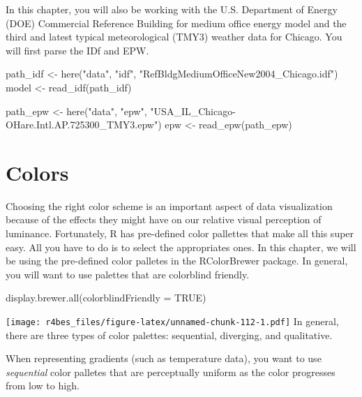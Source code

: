 \documentclass[
]{book}
\newenvironment{Shaded}{\begin{snugshade}}{\end{snugshade}}
\newcommand{\AttributeTok}[1]{\textcolor[rgb]{0.77,0.63,0.00}{#1}}
\newcommand{\ConstantTok}[1]{\textcolor[rgb]{0.00,0.00,0.00}{#1}}
\newcommand{\FunctionTok}[1]{\textcolor[rgb]{0.00,0.00,0.00}{#1}}
\newcommand{\NormalTok}[1]{#1}
\newcommand{\OtherTok}[1]{\textcolor[rgb]{0.56,0.35,0.01}{#1}}
\newcommand{\StringTok}[1]{\textcolor[rgb]{0.31,0.60,0.02}{#1}}
\begin{document}
In this chapter, you will also be working with the U.S. Department of Energy (DOE) Commercial Reference Building for medium office energy model \citep{deru_us_2011} and the third and latest typical meteorological (TMY3) weather data for Chicago. You will first parse the IDf and EPW.

\begin{Shaded}
\begin{Highlighting}[]
\NormalTok{path\_idf }\OtherTok{\textless{}{-}} \FunctionTok{here}\NormalTok{(}\StringTok{"data"}\NormalTok{, }\StringTok{"idf"}\NormalTok{, }\StringTok{"RefBldgMediumOfficeNew2004\_Chicago.idf"}\NormalTok{)}
\NormalTok{model }\OtherTok{\textless{}{-}} \FunctionTok{read\_idf}\NormalTok{(path\_idf)}

\NormalTok{path\_epw }\OtherTok{\textless{}{-}} \FunctionTok{here}\NormalTok{(}\StringTok{"data"}\NormalTok{, }\StringTok{"epw"}\NormalTok{, }\StringTok{"USA\_IL\_Chicago{-}OHare.Intl.AP.725300\_TMY3.epw"}\NormalTok{)}
\NormalTok{epw }\OtherTok{\textless{}{-}} \FunctionTok{read\_epw}\NormalTok{(path\_epw)}
\end{Highlighting}
\end{Shaded}

\hypertarget{colors}{%
\section{Colors}\label{colors}}

Choosing the right color scheme is an important aspect of data visualization because of the effects they might have on our relative visual perception of luminance. Fortunately, R has pre-defined color pallettes that make all this super easy. All you have to do is to select the appropriates ones. In this chapter, we will be using the pre-defined color palletes in the RColorBrewer package. In general, you will want to use palettes that are colorblind friendly.

\begin{Shaded}
\begin{Highlighting}[]
\FunctionTok{display.brewer.all}\NormalTok{(}\AttributeTok{colorblindFriendly =} \ConstantTok{TRUE}\NormalTok{)}
\end{Highlighting}
\end{Shaded}

\texttt{[image: r4bes\_files/figure-latex/unnamed-chunk-112-1.pdf]}
In general, there are three types of color palettes: sequential, diverging, and qualitative.

When representing gradients (such as temperature data), you want to use \emph{sequential} color palletes that are perceptually uniform as the color progresses from low to high.
\end{document}
